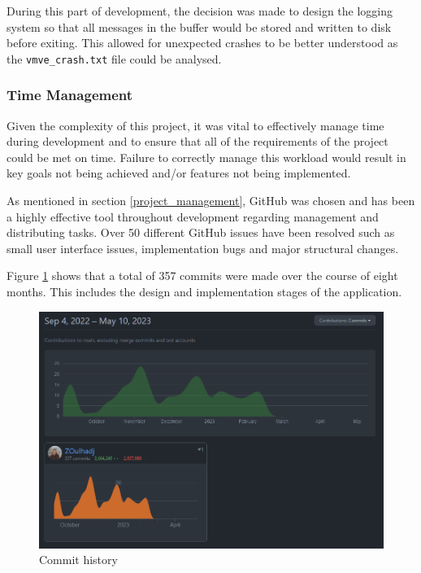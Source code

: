 \documentclass[11pt]{article}
\begin{document}
During this part of development, the decision was made to design the logging
system so that all messages in the buffer would be stored and written to disk
before exiting. This allowed for unexpected crashes to be better understood as
the \lstinline{vmve_crash.txt} file could be analysed.

\subsubsection{Time Management}
Given the complexity of this project, it was vital to effectively manage time
during development and to ensure that all of the requirements of the project
could be met on time. Failure to correctly manage this workload would result in
key goals not being achieved and/or features not being implemented.

As mentioned in section \ref{project_management}, GitHub was chosen and has been
a highly effective tool throughout development regarding management and
distributing tasks. Over 50 different GitHub issues have been resolved such as
small user interface issues, implementation bugs and major structural changes.

Figure \ref{fig:commit_history} shows that a total of 357 commits were made over
the course of eight months. This includes the design and implementation stages
of the application.
\begin{figure}[H]
  \centering
  \includegraphics[width=\textwidth]{images/commit_history.png}
  \caption{Commit history}
  \label{fig:commit_history}
\end{figure}
    
\end{document}
